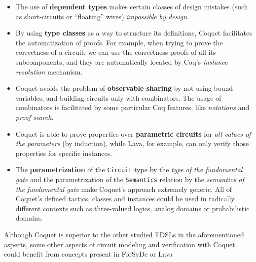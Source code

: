             \begin{itemize}
                \item The use of \textbf{dependent types} makes certain classes of design mistakes
                    (such as short-circuits or ``floating'' wires) \emph{impossible by design}.

                \item By using \textbf{type classes} as a way to structure its definitions, Coquet
                    facilitates the automatization of proofs. For example, when trying to prove the
                    correctness of a circuit, we can use the correctness proofs of all its
                    subcomponents, and they are automatically located by Coq's \emph{instance
                        resolution} mechanism.

                \item Coquet avoids the problem of \textbf{observable sharing} by not using bound
                    variables, and building circuits only with combinators. The usage of combinators
                    is facilitated by some particular Coq features, like \emph{notations} and
                    \emph{proof search}.

                \item Coquet is able to prove properties over \textbf{parametric circuits} for
                    \emph{all values of the parameters} (by induction), while Lava, for example, can
                    only verify those properties for specific instances.

                \item The \textbf{parametrization} of the \texttt{Circuit} type by the \emph{type of
                        the fundamental gate} and the parametrization of the \texttt{Semantics}
                    relation by the \emph{semantics of the fundamental gate} make Coquet's approach
                    extremely generic. All of Coquet's defined tactics, classes and instances could
                    be used in radically different contexts such as three-valued logics, analog
                    domains or probabilistic domains.
            \end{itemize}

            Although Coquet is superior to the other studied \acp{EDSL} in the aforementioned aspects,
            some other aspects of circuit modeling and verification with Coquet could benefit from
            concepts present in ForSyDe or Lava

